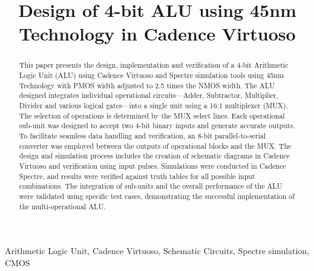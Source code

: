 \documentclass[conference]{IEEEtran}
\begin{document}
\title{Design of 4-bit ALU using 45nm Technology in Cadence Virtuoso\\}

\author{
}

\maketitle
\thispagestyle{plain}
\pagestyle{plain}

\begin{abstract}
This paper presents the design, implementation and verification of a 4-bit Arithmetic Logic Unit (ALU) using Cadence Virtuoso and Spectre simulation tools using 45nm Technology with PMOS width adjusted to 2.5 times the NMOS width. The ALU designed integrates individual operational circuits—Adder, Subtractor, Multiplier, Divider and various logical gates—into a single unit using a 16:1 multiplexer (MUX). The selection of operations is determined by the MUX select lines. Each operational sub-unit was designed to accept two 4-bit binary inputs and generate accurate outputs. To facilitate seamless data handling and verification, an 8-bit parallel-to-serial converter was employed between the outputs of operational blocks and the MUX. The design and simulation process includes the creation of schematic diagrams in  Cadence  Virtuoso and verification using input pulses. Simulations were conducted in Cadence Spectre, and results were verified against truth tables for all possible input combinations. The integration of sub-units and the overall performance of the ALU were validated using specific test cases, demonstrating the successful implementation of the multi-operational ALU.
\end{abstract}
\begin{IEEEkeywords}
Arithmetic Logic Unit, Cadence Virtuoso, Schematic Circuits, Spectre simulation, CMOS
\end{IEEEkeywords}
\end{document}
